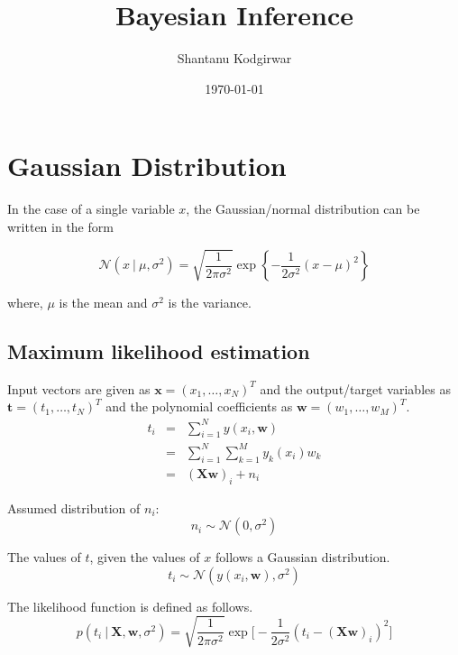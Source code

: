 \documentclass[11pt]{article}
\title{Bayesian Inference}
\date{\today}
\author{Shantanu Kodgirwar}
\newcommand\given[1][]{\:#1\vert\:}
\begin{document}
\maketitle

\section{Gaussian Distribution}

In the case of a single variable $x$, the Gaussian/normal distribution can be written in the form

\begin{equation}
    \mathcal{N}(x \given \mu, \sigma^2) = \sqrt{\frac{1}{2\pi \sigma^2}}\exp{\left\{-\frac{1}{2\sigma^2}\left(x - \mu \right)^2\right\}}
\end{equation}

where, $\mu$ is the mean and $\sigma^2$ is the variance.
\subsection{Maximum likelihood estimation}

Input vectors are given as $\bm{x} = (x_1, \ldots, x_N)^T$ and the output/target variables as $\bm{t} = (t_1, \ldots, t_N)^T$ and the polynomial coefficients as $\bm{w} = (w_1, \ldots, w_M)^T$.
\begin{eqnarray}
        t_{i}
        &=& \sum_{i=1}^N y(x_i, \bm{w})\\
        &=&
        \sum_{i=1}^N \sum_{k=1}^M y_k(x_i)w_k\\
        &=&
        (\bm{X}\bm{w})_i + n_i
\end{eqnarray}

Assumed distribution of $n_i$:
\begin{equation}\label{eqn:model}
n_i \sim \mathcal{N}(0, \sigma^2)
\end{equation}

The values of $t$, given the values of $x$ follows a Gaussian distribution.
\begin{equation}
    t_i \sim \mathcal{N}(y(x_i, \bm{w}), \sigma^2)
\end{equation}

The likelihood function is defined as follows.
\begin{equation}
    p(t_i \given \bm{X}, \bm{w}, \sigma^2) = \sqrt{\frac{1}{2\pi\sigma^2}}\exp{\Big[-\frac{1}{2\sigma^2} \left(t_i - (\bm{X}\bm{w})_i\right)^2\Big]}
\end{equation}
\end{document}
